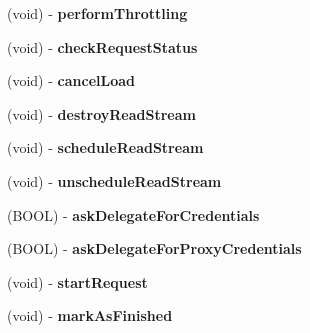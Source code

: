 \begin{DoxyCompactItemize}
\item 
\hypertarget{interface_a_s_i_h_t_t_p_request_a510b47cc1be0b9c1968a9c8cc3859038}{
(void) -\/ {\bfseries performThrottling}}
\label{interface_a_s_i_h_t_t_p_request_a510b47cc1be0b9c1968a9c8cc3859038}

\item 
\hypertarget{interface_a_s_i_h_t_t_p_request_a068fc55ba6cb87ad880bded7fd78ab27}{
(void) -\/ {\bfseries checkRequestStatus}}
\label{interface_a_s_i_h_t_t_p_request_a068fc55ba6cb87ad880bded7fd78ab27}

\item 
\hypertarget{interface_a_s_i_h_t_t_p_request_ad64a88ff354a1e9acd0e50f6bd6383af}{
(void) -\/ {\bfseries cancelLoad}}
\label{interface_a_s_i_h_t_t_p_request_ad64a88ff354a1e9acd0e50f6bd6383af}

\item 
\hypertarget{interface_a_s_i_h_t_t_p_request_ab3dbbd41ced7e54f058267aaa2e80150}{
(void) -\/ {\bfseries destroyReadStream}}
\label{interface_a_s_i_h_t_t_p_request_ab3dbbd41ced7e54f058267aaa2e80150}

\item 
\hypertarget{interface_a_s_i_h_t_t_p_request_a9298c802e2cd503d0f3ae6f508f59e52}{
(void) -\/ {\bfseries scheduleReadStream}}
\label{interface_a_s_i_h_t_t_p_request_a9298c802e2cd503d0f3ae6f508f59e52}

\item 
\hypertarget{interface_a_s_i_h_t_t_p_request_a036ae593e23c948377acca2d405ab265}{
(void) -\/ {\bfseries unscheduleReadStream}}
\label{interface_a_s_i_h_t_t_p_request_a036ae593e23c948377acca2d405ab265}

\item 
\hypertarget{interface_a_s_i_h_t_t_p_request_a80a8049a97291996c5b32c8048ced862}{
(BOOL) -\/ {\bfseries askDelegateForCredentials}}
\label{interface_a_s_i_h_t_t_p_request_a80a8049a97291996c5b32c8048ced862}

\item 
\hypertarget{interface_a_s_i_h_t_t_p_request_a914ee841472efc3e9124452df94d6f3a}{
(BOOL) -\/ {\bfseries askDelegateForProxyCredentials}}
\label{interface_a_s_i_h_t_t_p_request_a914ee841472efc3e9124452df94d6f3a}

\item 
\hypertarget{interface_a_s_i_h_t_t_p_request_ae64756aed5b2103d48f7a10c04916c60}{
(void) -\/ {\bfseries startRequest}}
\label{interface_a_s_i_h_t_t_p_request_ae64756aed5b2103d48f7a10c04916c60}

\item 
\hypertarget{interface_a_s_i_h_t_t_p_request_a3218690ab3ce9d401f26f7e0d0e2c995}{
(void) -\/ {\bfseries markAsFinished}}
\label{interface_a_s_i_h_t_t_p_request_a3218690ab3ce9d401f26f7e0d0e2c995}


\end{DoxyCompactItemize}
